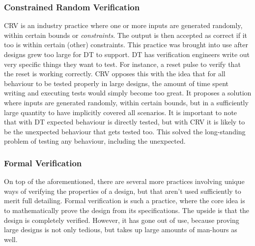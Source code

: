 \documentclass[11pt,british]{article}
\begin{document}
\subsubsection{Constrained Random Verification}
\gls{CRV} is an industry practice where one or more inputs are generated randomly, within certain bounds or \emph{constraints}.\cite{crv1,crv2} The output is then accepted as correct if it too is within certain (other) constraints. This practice was brought into use after designs grew too large for \gls{DT} to support. DT has verification engineers write out very specific things they want to test. For instance, a reset pulse to verify that the reset is working correctly. CRV opposes this with the idea that for all behaviour to be tested properly in large designs, the amount of time spent writing and executing tests would simply become too great. It proposes a solution where inputs are generated randomly, within certain bounds, but in a sufficiently large quantity to have implicitly covered all scenarios. It is important to note that with DT expected behaviour is directly tested, but with CRV it is likely to be the unexpected behaviour that gets tested too. This solved the long-standing problem of testing any behaviour, including the unexpected.

\subsubsection{Formal Verification}
On top of the aforementioned, there are several more practices involving unique ways of verifying the properties of a design, but that aren't used sufficiently to merit full detailing. Formal verification is such a practice, where the core idea is to mathematically prove the design from its specifications.\cite{assertformal,formal} The upside is that the design is completely verified. However, it has gone out of use, because proving large designs is not only tedious, but takes up large amounts of man-hours as well.

\end{document}
